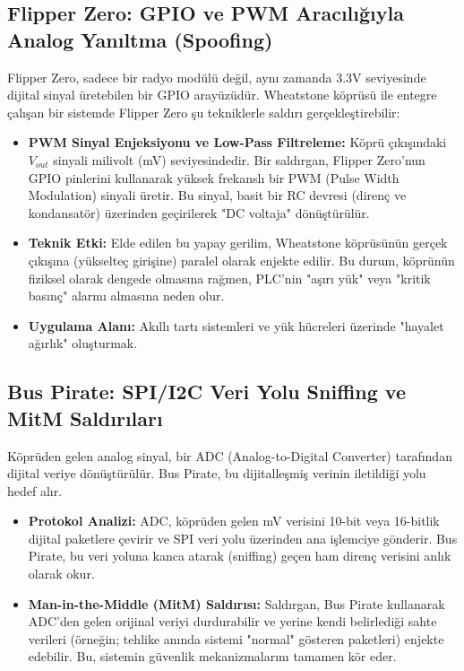 \documentclass[12pt,a4paper]{article}
\begin{document}
\subsection{Flipper Zero: GPIO ve PWM Aracılığıyla Analog Yanıltma (Spoofing)}
Flipper Zero, sadece bir radyo modülü değil, aynı zamanda 3.3V seviyesinde dijital sinyal üretebilen bir GPIO arayüzüdür. Wheatstone köprüsü ile entegre çalışan bir sistemde Flipper Zero şu tekniklerle saldırı gerçekleştirebilir:

\begin{itemize}
    \item \textbf{PWM Sinyal Enjeksiyonu ve Low-Pass Filtreleme:} Köprü çıkışındaki $V_{out}$ sinyali milivolt (mV) seviyesindedir. Bir saldırgan, Flipper Zero'nun GPIO pinlerini kullanarak yüksek frekanslı bir PWM (Pulse Width Modulation) sinyali üretir. Bu sinyal, basit bir RC devresi (direnç ve kondansatör) üzerinden geçirilerek "DC voltaja" dönüştürülür. 
    \item \textbf{Teknik Etki:} Elde edilen bu yapay gerilim, Wheatstone köprüsünün gerçek çıkışına (yükselteç girişine) paralel olarak enjekte edilir. Bu durum, köprünün fiziksel olarak dengede olmasına rağmen, PLC'nin "aşırı yük" veya "kritik basınç" alarmı almasına neden olur.
    \item \textbf{Uygulama Alanı:} Akıllı tartı sistemleri ve yük hücreleri üzerinde "hayalet ağırlık" oluşturmak.
\end{itemize}



\subsection{Bus Pirate: SPI/I2C Veri Yolu Sniffing ve MitM Saldırıları}
Köprüden gelen analog sinyal, bir ADC (Analog-to-Digital Converter) tarafından dijital veriye dönüştürülür. Bus Pirate, bu dijitalleşmiş verinin iletildiği yolu hedef alır.

\begin{itemize}
    \item \textbf{Protokol Analizi:} ADC, köprüden gelen mV verisini 10-bit veya 16-bitlik dijital paketlere çevirir ve SPI veri yolu üzerinden ana işlemciye gönderir. Bus Pirate, bu veri yoluna kanca atarak (sniffing) geçen ham direnç verisini anlık olarak okur.
    \item \textbf{Man-in-the-Middle (MitM) Saldırısı:} Saldırgan, Bus Pirate kullanarak ADC'den gelen orijinal veriyi durdurabilir ve yerine kendi belirlediği sahte verileri (örneğin; tehlike anında sistemi "normal" gösteren paketleri) enjekte edebilir. Bu, sistemin güvenlik mekanizmalarını tamamen kör eder.
\end{itemize}
\end{document}
